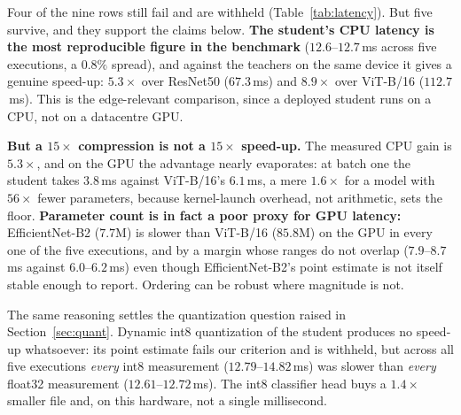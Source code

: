 \documentclass[conference]{IEEEtran}
\begin{document}
Four of the nine rows still fail and are withheld (Table~\ref{tab:latency}). But
five survive, and they support the claims below. \textbf{The student's CPU latency
is the most reproducible figure in the benchmark} ($12.6$--$12.7$\,ms across five
executions, a $0.8\%$ spread), and against the teachers on the same device it
gives a genuine speed-up: $5.3\times$ over ResNet50 ($67.3$\,ms) and $8.9\times$
over ViT-B/16 ($112.7$\,ms). This is the edge-relevant comparison, since a
deployed student runs on a CPU, not on a datacentre GPU.

\textbf{But a $15\times$ compression is not a $15\times$ speed-up.} The measured
CPU gain is $5.3\times$, and on the GPU the advantage nearly evaporates: at batch
one the student takes $3.8$\,ms against ViT-B/16's $6.1$\,ms, a mere $1.6\times$
for a model with $56\times$ fewer parameters, because kernel-launch overhead, not
arithmetic, sets the floor. \textbf{Parameter count is in fact a poor proxy for
GPU latency:} EfficientNet-B2 ($7.7$M) is slower than ViT-B/16 ($85.8$M) on the
GPU in every one of the five executions, and by a margin whose ranges do not
overlap ($7.9$--$8.7$\,ms against $6.0$--$6.2$\,ms) even though
EfficientNet-B2's point estimate is not itself stable enough to report.
Ordering can be robust where magnitude is not.

The same reasoning settles the quantization question raised in
Section~\ref{sec:quant}. Dynamic int8 quantization of the student produces no
speed-up whatsoever: its point estimate fails our criterion and is withheld, but
across all five executions \emph{every} int8 measurement ($12.79$--$14.82$\,ms)
was slower than \emph{every} float32 measurement ($12.61$--$12.72$\,ms). The
int8 classifier head buys a $1.4\times$ smaller file and, on this hardware, not a
single millisecond.

\begin{table}
  \centering
  \caption{Batch-one latency, reported as the range over five independent
  executions of the entire benchmark on a cooled, idle machine. A figure is
  published only if those five medians agree to within $10\%$, a criterion fixed
  in advance; rows that fail are withheld ($-$) rather than reported with a
  caveat. The GPU is an RTX 4070 Laptop --- a mobile part, not the desktop 4070.}
  \label{tab:latency}
\end{table}
\end{document}
